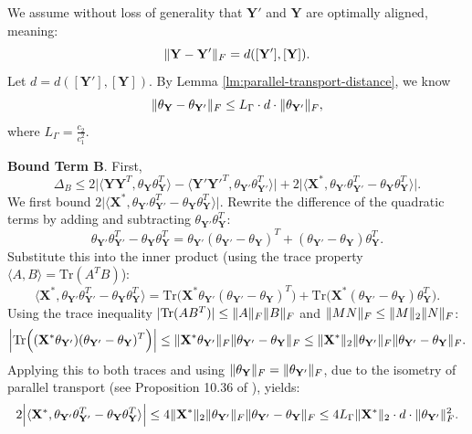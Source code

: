 \documentclass[11pt]{article}
\newcommand{\0}{{\mathbf{0}}}
\newcommand{\1}{{\mathbf{1}}}
\newcommand{\X}{{\mathbf{X}}}
\newcommand{\F}{{\rm F}}
\begin{document}
{We assume without loss of generality that $\mathbf{Y'}$ and $\mathbf{Y}$ are {optimally aligned}, meaning:
\[
\|\mathbf{Y} - \mathbf{Y'}\|_{\F} = d([\mathbf{Y'}], [\mathbf{Y}]).
\]
Let $d = d([\mathbf{Y'}], [\mathbf{Y}])$. By Lemma \ref{lm:parallel-transport-distance}, we know 
    \[
    \|\theta_{\mathbf{Y}} - \theta_{\mathbf{Y'}}\|_{\F} \le L_{\Gamma} \cdot d \cdot \|\theta_{\mathbf{Y'}}\|_{\F},
    \] 
where $L_{\Gamma} = \frac{c_2}{c_1^2}$.





{ \noindent \bf Bound Term B}.
First,
\[
\Delta_B \le 2 \Big| \langle \mathbf{Y}\mathbf{Y}^T, \theta_{\mathbf{Y}} \theta_{\mathbf{Y}}^T \rangle - \langle \mathbf{Y'}\mathbf{Y'}^T, \theta_{\mathbf{Y'}} \theta_{\mathbf{Y'}}^T \rangle \Big| + 2 \Big| \langle \X^*, \theta_{\mathbf{Y'}} \theta_{\mathbf{Y'}}^T - \theta_{\mathbf{Y}} \theta_{\mathbf{Y}}^T \rangle \Big|.
\]
We first bound $2 \big| \langle \X^*, \theta_{\mathbf{Y'}} \theta_{\mathbf{Y'}}^T - \theta_{\mathbf{Y}} \theta_{\mathbf{Y}}^T \rangle \big|$. 
Rewrite the difference of the quadratic terms by adding and subtracting $\theta_{\mathbf{Y'}} \theta_{\mathbf{Y}}^T$:
\[
\theta_{\mathbf{Y'}} \theta_{\mathbf{Y'}}^T - \theta_{\mathbf{Y}} \theta_{\mathbf{Y}}^T = \theta_{\mathbf{Y'}}(\theta_{\mathbf{Y'}} - \theta_{\mathbf{Y}})^T + (\theta_{\mathbf{Y'}} - \theta_{\mathbf{Y}})\theta_{\mathbf{Y}}^T.
\]
Substitute this into the inner product (using the trace property $\langle A, B \rangle = \text{Tr}(A^T B)$):
\begin{equation}
	\langle \X^*, \theta_{\mathbf{Y'}} \theta_{\mathbf{Y'}}^T - \theta_{\mathbf{Y}} \theta_{\mathbf{Y}}^T \rangle = \text{Tr}\Big( \X^* \theta_{\mathbf{Y'}}(\theta_{\mathbf{Y'}} - \theta_{\mathbf{Y}})^T \Big) + \text{Tr}\Big( \X^*(\theta_{\mathbf{Y'}} - \theta_{\mathbf{Y}})\theta_{\mathbf{Y}}^T \Big). \label{ineq:X-first-part}
\end{equation}
Using the trace inequality $|\text{Tr}(A B^T)| \le \|A\|_{\F} \|B\|_{\F}$ and $\|MN\|_{\F} \le \|M\|_2 \|N\|_{\F}$:
\[
\Big| \text{Tr}\Big( (\X^* \theta_{\mathbf{Y'}})(\theta_{\mathbf{Y'}} - \theta_{\mathbf{Y}})^T \Big) \Big| \le \|\X^* \theta_{\mathbf{Y'}}\|_{\F} \|\theta_{\mathbf{Y'}} - \theta_{\mathbf{Y}}\|_{\F} \le \|\X^*\|_2 \|\theta_{\mathbf{Y'}}\|_{\F} \|\theta_{\mathbf{Y'}} - \theta_{\mathbf{Y}}\|_{\F}.
\]
Applying this to both traces and using $\|\theta_{\mathbf{Y}}\|_{\F} = \|\theta_{\mathbf{Y'}}\|_{\F}$, due to the isometry of parallel transport (see Proposition 10.36 of \cite{boumal2020introduction}), yields:
\[
2 \Big| \langle \X^*, \theta_{\mathbf{Y'}} \theta_{\mathbf{Y'}}^T - \theta_{\mathbf{Y}} \theta_{\mathbf{Y}}^T \rangle \Big| \le 4 \|\X^*\|_2 \|\theta_{\mathbf{Y'}}\|_{\F} \|\theta_{\mathbf{Y'}} - \theta_{\mathbf{Y}}\|_{\F} \le 4 L_{\Gamma} \|\X^*\|_2 \cdot d \cdot \|\theta_{\mathbf{Y'}}\|_{\F}^2.
\]

}
\end{document}
